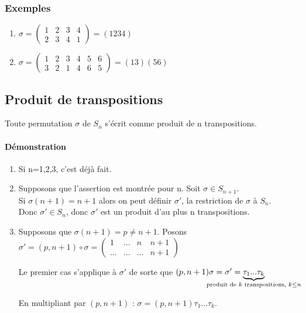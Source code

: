 \documentclass[a4paper,10pt]{book} %
\begin{document}
\subsubsection{Exemples}
\begin{enumerate}
\item $\sigma=\begin{pmatrix}
1&2&3&4\\
2&3&4&1
\end{pmatrix}=(1234)$

\item $\sigma=\begin{pmatrix}
1&2&3&4&5&6\\
3&2&1&4&6&5
\end{pmatrix}=(13)(56)$
\end{enumerate}

\newpage

\subsection{Produit de transpositions}
Toute permutation $\sigma$ de $S_n$ s'écrit comme produit de n transpositions.

\paragraph{Démonstration}
\begin{enumerate}
\item Si n=1,2,3, c'est déjà fait.
\item
Supposons que l'assertion est montrée pour n. Soit $\sigma\in S_{n+1}$.\\

Si $\sigma(n+1)=n+1$ alors on peut définir $\sigma'$, la restriction de $\sigma$ à $S_n$.\\ Donc $\sigma'\in S_n$, donc $\sigma'$ est un produit d'au plus n transpositions.

\item Supposons que $\sigma(n+1)=p\neq n+1$.
Posons $\sigma'=(p,n+1)\circ \sigma=\begin{pmatrix}
1&\dots&n&n+1\\
\dots &\dots & \dots & n+1
\end{pmatrix}$

Le premier cas s'applique à $\sigma'$ de sorte que $(p,n+1)\sigma=\sigma'=\underset{\mathclap{\text{produit de }k\text{ transpositions, }k\leq n}}{\underbrace{\tau_1...\tau_k}}$

En multipliant par $(p,n+1)$ : $\sigma=(p,n+1)\tau_1...\tau_k$.
\end{enumerate}
\end{document}
